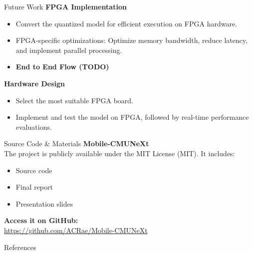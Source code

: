 \documentclass[aspectratio=169,xcolor=dvipsnames]{beamer}
\newcommand{\vtab}{\vspace{0.3cm}}
\begin{document}
\begin{frame}{Future Work}
    \textbf{FPGA Implementation}
    \begin{itemize}
        \item Convert the quantized model for efficient execution on FPGA hardware.
        \item FPGA-specific optimizations: Optimize memory bandwidth, reduce latency, and implement parallel processing.
        \item \textbf{End to End Flow (TODO)}
    \end{itemize}
    \vtab
    \textbf{Hardware Design}
    \begin{itemize}
        \item Select the most suitable FPGA board.
        \item Implement and test the model on FPGA, followed by real-time performance evaluations.
    \end{itemize}
\end{frame}


\begin{frame}{Source Code \& Materials}
    \centering
    \vspace{1em}
    \textbf{\Large Mobile-CMUNeXt} \\
    \vspace{0.5em}
    The project is publicly available under the MIT License (MIT). It includes: \\
    \begin{itemize}
        \centering
        \item Source code
        \item Final report
        \item Presentation slides
    \end{itemize}
    \vspace{1em}
    \textbf{Access it on GitHub:} \\
    \url{https://github.com/ACRae/Mobile-CMUNeXt}
\end{frame}



\begin{frame}[allowframebreaks]{References}
    \footnotesize
    
\end{frame}



\end{document}
